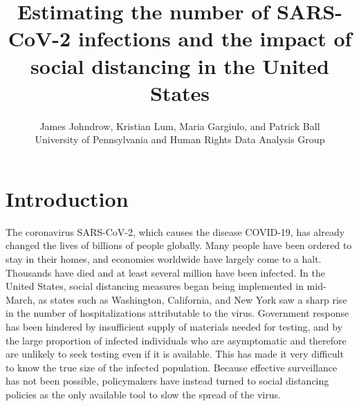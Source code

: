 \documentclass[11pt]{article}
\title{Estimating the number of SARS-CoV-2 infections and the impact of social distancing in the United States}
\author{James Johndrow, Kristian Lum, Maria Gargiulo, and Patrick Ball \\ University of Pennsylvania and Human Rights Data Analysis Group}
\theoremstyle{plain}
\newcommand{\1}{\mathbf 1}
\begin{document}
\maketitle
{}


\section{Introduction}

The coronavirus SARS-CoV-2, which causes the disease COVID-19, has already changed the lives of billions of people globally. Many people have been ordered to stay in their homes, and economies worldwide have largely come to a halt. Thousands have died and at least several million have been infected. In the United States, social distancing measures began being implemented in mid-March, as states such as Washington, California, and New York saw a sharp rise in the number of hospitalizations attributable to the virus. Government response has been hindered by insufficient supply of materials needed for testing, and by the large proportion of infected individuals who are asymptomatic and therefore are unlikely to seek testing even if it is available. This has made it very difficult to know the true size of the infected population. Because effective surveillance has not been possible, policymakers have instead turned to social distancing policies as the only available tool to slow the spread of the virus. 
\end{document}
